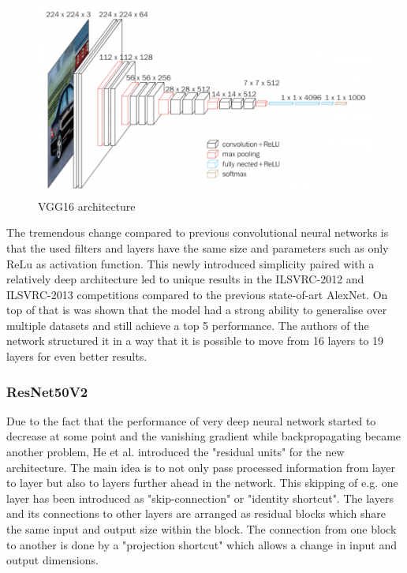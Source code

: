 \begin{figure}[ht]
  \centering
  \includegraphics[width=\linewidth]{figures/vgg16.png}
  \caption{VGG16 architecture}
  \label{fig:vgg16}
\end{figure}

The tremendous change compared to previous convolutional neural networks is that the used filters and layers have the same size and parameters such as only ReLu as activation function\cite{simonyan2015deep}. This newly introduced simplicity paired with a relatively deep architecture led to unique results in the ILSVRC-2012 and ILSVRC-2013 competitions compared to the previous state-of-art AlexNet. On top of that is was shown that the model had a strong ability to generalise over multiple datasets and still achieve a top 5 performance. The authors of the network structured it in a way that it is possible to move from 16 layers to 19 layers for even better results.

\subsubsection{ResNet50V2}\label{resnet}
Due to the fact that the performance of very deep neural network started to decrease at some point and the vanishing gradient while backpropagating became another problem, He et al. introduced the "residual units" for the new architecture\cite{he2015deep}. The main idea is to not only pass processed information from layer to layer but also to layers further ahead in the network. This skipping of e.g. one layer has been introduced as "skip-connection" or "identity shortcut". The layers and its connections to other layers are arranged as residual blocks which share the same input and output size within the block\cite{he2015deep}. The connection from one block to another is done by a "projection shortcut" which allows a change in input and output dimensions.

